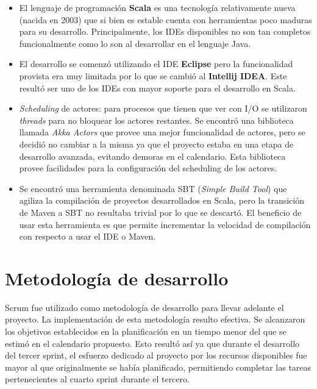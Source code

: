 \documentclass[12pt,a4paper]{article}
\let\stdsection\section
\renewcommand\section{\newpage\stdsection}
\begin{document}
\begin{itemize}
	\item El lenguaje de programación \textbf{Scala} es una tecnología relativamente nueva (nacida en 2003) que
	si bien es estable cuenta con herramientas poco maduras para su desarrollo. Principalmente, los IDEs disponibles
	no son tan completos funcionalmente como lo son al desarrollar en el lenguaje Java.

	\item El desarrollo se comenzó utilizando el IDE \textbf{Eclipse} pero la funcionalidad provista era muy
	limitada por lo que se cambió al \textbf{Intellij IDEA}. Este resultó ser uno de los IDEs con mayor soporte
	para el desarrollo en Scala.

	\item \textit{Scheduling} de actores: para procesos que tienen que ver con I/O se utilizaron \textit{threads}
	para no bloquear los actores restantes. Se encontró una biblioteca llamada \textit{Akka Actors} \cite{akka} que 
	provee una mejor funcionalidad de actores, pero se decidió no cambiar a la misma ya que el proyecto estaba
	en una etapa de desarrollo avanzada, evitando demoras en el calendario. Esta biblioteca provee facilidades
	para la configuración del scheduling de los actores.

    \item Se encontró una herramienta denominada SBT \cite{sbt} (\textit{Simple Build Tool}) que agiliza la compilación
    de proyectos desarrollados en Scala, pero la transición de Maven a SBT no resultaba trivial por lo que
    se descartó. El beneficio de usar esta herramienta es que permite incrementar la velocidad de compilación
    con respecto a usar el IDE o Maven.
    
\end{itemize}

\section{Metodología de desarrollo}

Scrum fue utilizado como metodología de desarrollo para llevar adelante el proyecto. La implementación de esta metodología resulto efectiva. Se alcanzaron los objetivos establecidos en la planificación en un tiempo menor 
del que se estimó en el calendario propuesto. Esto resultó así ya que durante el desarrollo del tercer sprint,
el esfuerzo dedicado al proyecto por los recursos disponibles fue mayor al que originalmente se había planificado, permitiendo completar las tareas pertenecientes al cuarto sprint durante el tercero.
\end{document}
